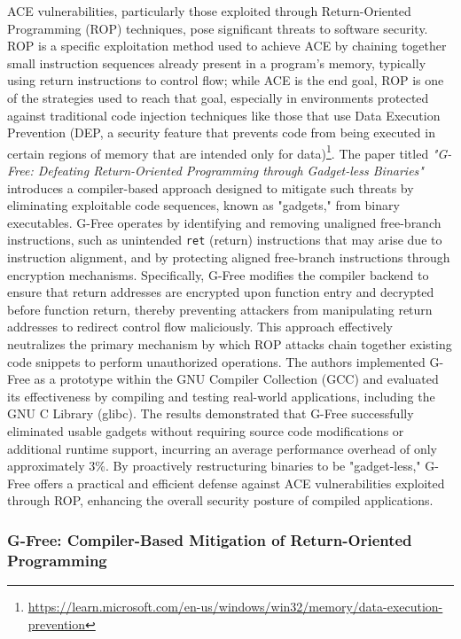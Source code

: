 \documentclass[a4paper]{usiinfbachelorproject}
\begin{document}
ACE vulnerabilities, particularly those exploited through Return-Oriented Programming (ROP) techniques, pose significant threats to software security. ROP is a specific exploitation method used to achieve ACE by chaining together small instruction sequences already present in a program’s memory, typically using return instructions to control flow; while ACE is the end goal, ROP is one of the strategies used to reach that goal, especially in environments protected against traditional code injection techniques like those that use Data Execution Prevention (DEP, a security feature that prevents code from being executed in certain regions of memory that are intended only for data)\footnote{\url{https://learn.microsoft.com/en-us/windows/win32/memory/data-execution-prevention}}. The paper titled \textit{"G-Free: Defeating Return-Oriented Programming through Gadget-less Binaries"}\cite{onarlioglu2010gfree} introduces a compiler-based approach designed to mitigate such threats by eliminating exploitable code sequences, known as "gadgets," from binary executables. G-Free operates by identifying and removing unaligned free-branch instructions, such as unintended \texttt{ret} (return) instructions that may arise due to instruction alignment, and by protecting aligned free-branch instructions through encryption mechanisms. Specifically, G-Free modifies the compiler backend to ensure that return addresses are encrypted upon function entry and decrypted before function return, thereby preventing attackers from manipulating return addresses to redirect control flow maliciously. This approach effectively neutralizes the primary mechanism by which ROP attacks chain together existing code snippets to perform unauthorized operations. The authors implemented G-Free as a prototype within the GNU Compiler Collection (GCC) and evaluated its effectiveness by compiling and testing real-world applications, including the GNU C Library (glibc). The results demonstrated that G-Free successfully eliminated usable gadgets without requiring source code modifications or additional runtime support, incurring an average performance overhead of only approximately 3\%. By proactively restructuring binaries to be "gadget-less," G-Free offers a practical and efficient defense against ACE vulnerabilities exploited through ROP, enhancing the overall security posture of compiled applications.

\subsubsection{G-Free: Compiler-Based Mitigation of Return-Oriented Programming}
\end{document}
